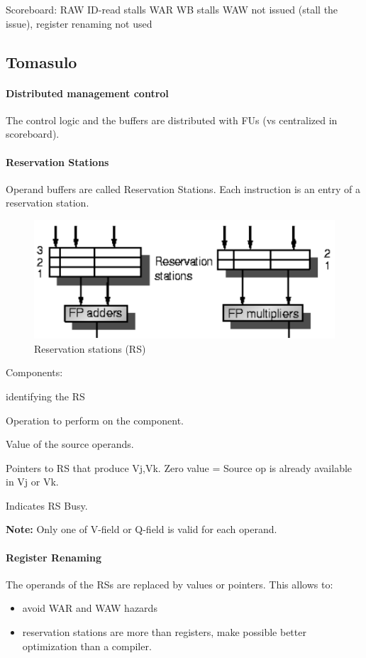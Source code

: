 Scoreboard:
RAW ID-read stalls
WAR WB stalls
WAW not issued (stall the issue), register renaming not used

\subsection{Tomasulo}\label{subsec:tomasulo}
\paragraph{Distributed management control} The control logic and the buffers are distributed with FUs (vs centralized in
scoreboard).

\paragraph{Reservation Stations} Operand buffers are called Reservation Stations.
Each instruction is an entry of a reservation station.
\begin{figure}[h]
    \centering
    \includegraphics[scale = 0.4]{images/reservation-station}
    \caption{Reservation stations (RS)}
    \label{fig:reservation-stations}
\end{figure}
Components:
\begin{description}[style=multiline,leftmargin=2cm,font=\normalfont]
    \item[Tag] identifying the RS
    \item[OP] Operation to perform on the component.
    \item[Vj,Vk] Value of the source operands.
    \item[Qj,Qk] Pointers to RS that produce Vj,Vk. Zero value = Source op is already available in Vj or Vk.
    \item[Busy] Indicates RS Busy.
\end{description}
\textbf{Note:} Only one of V-field or Q-field is valid for each operand.

\paragraph{Register Renaming} The operands of the RSs are replaced by values or pointers.
This allows to:
\begin{itemize}
    \item avoid WAR and WAW hazards
    \item reservation stations are more than registers, make possible better optimization than a compiler.
\end{itemize}

